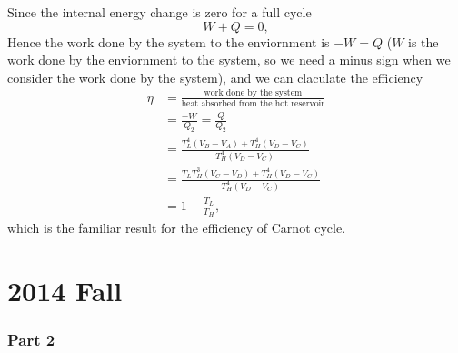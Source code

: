 \documentclass[10pt]{article}
\begin{document}
Since the internal energy change is zero for a full cycle 
\begin{equation}
	W + Q = 0,
\end{equation}
Hence the work done by the system to the enviornment is $-W = Q$ ($W$ is the work done by the enviornment to the system, so we need a minus sign when we consider the work done by the system), and we can claculate the efficiency 
\begin{align*}
	\eta &= \frac{\text{work done by the system}}{\text{heat absorbed from the hot reservoir}} \\
		 &= \frac{-W}{Q_2} = \frac{Q}{Q_2} \\
		 &= \frac{T_L^4(V_B - V_A) + T_H^4 (V_D - V_C)}{T_H^4 (V_D - V_C)} \\
		 &= \frac{T_L T_H^3(V_C -V_D) + T_H^4 (V_D - V_C)}{T_H^4 (V_D - V_C)} \\
		 &= 1 - \frac{T_L}{T_H},
\end{align*}
which is the familiar result for the efficiency of Carnot cycle.
\newpage
\part{2014 Fall}
\section{Part 2}
\end{document}
